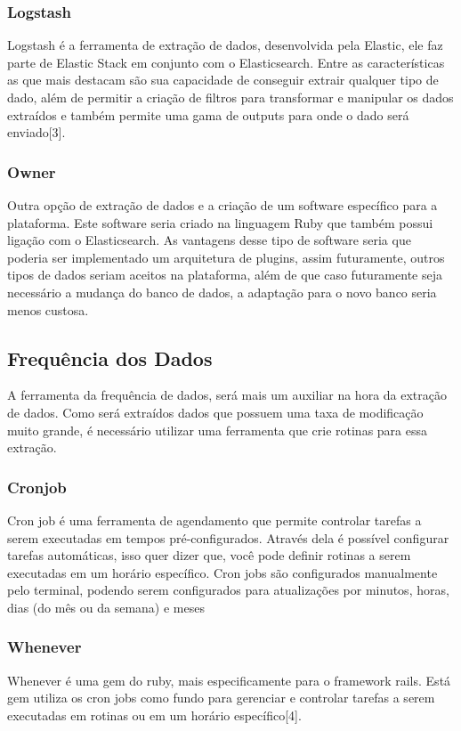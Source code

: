 \subsubsection*{Logstash}
Logstash é a ferramenta de extração de dados, desenvolvida pela Elastic, ele faz parte de Elastic Stack em conjunto com o Elasticsearch. Entre as características as que mais destacam são sua capacidade de conseguir extrair qualquer tipo de dado, além de permitir a criação de filtros para transformar e manipular os dados extraídos e também permite uma gama de outputs para onde o dado será enviado[3].
\subsubsection*{Owner}
Outra opção de extração de dados e a criação de um software específico para a plataforma. Este software seria criado na linguagem Ruby que também possui ligação com o Elasticsearch. As vantagens desse tipo de software seria que poderia ser implementado um arquitetura de plugins, assim futuramente, outros tipos de dados seriam aceitos na plataforma, além de que caso futuramente seja necessário a mudança do banco de dados, a adaptação para o novo banco seria menos custosa.
\subsection*{Frequência dos Dados}
A ferramenta da frequência de dados, será mais um auxiliar na hora da extração de dados. Como será extraídos dados que possuem uma taxa de modificação muito grande, é necessário utilizar uma ferramenta que crie rotinas para essa extração.
\subsubsection*{Cronjob}
Cron job é uma ferramenta de agendamento que permite controlar tarefas a serem executadas em tempos pré-configurados. Através dela é possível configurar tarefas automáticas, isso quer dizer que, você pode definir rotinas a serem executadas em um horário específico. Cron jobs são configurados manualmente pelo terminal, podendo serem configurados para atualizações por minutos, horas, dias (do mês ou da semana) e meses
\subsubsection*{Whenever}
Whenever é uma gem do ruby, mais especificamente para o framework rails. Está gem utiliza os cron jobs como fundo para gerenciar e controlar tarefas a serem executadas em rotinas ou em um horário específico[4].
